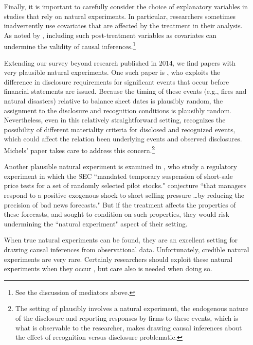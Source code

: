 \documentclass[12pt,reqno,titlepage]{amsart}
\theoremstyle{definition}
\begin{document}
\begin{doublespace}
Finally, it is important to carefully consider the choice of explanatory variables in studies that rely on natural experiments.
In particular, researchers sometimes inadvertently use covariates that are affected by the treatment in their analysis.  
As noted by \citet[p.\,116]{Imbens:2015aa}, including such post-treatment variables as covariates can undermine the validity of causal inferences.\footnote{See the discussion of mediators above.}

Extending our survey beyond research published in 2014, we find papers with very plausible natural experiments.
One such paper is \citet{Michels:2015aa}, who exploits the difference in disclosure requirements for significant events that occur before financial statements are issued. 
Because the timing of these events (e.g., fires and natural disasters) relative to balance sheet dates is plausibly random, the assignment to the disclosure and recognition conditions is plausibly random. 
Nevertheless, even in this relatively straightforward setting, \citet{Michels:2015aa} recognizes the possibility of different materiality criteria for disclosed and recognized events, which could affect the relation been underlying events and observed disclosures. Michels' paper takes care to address this concern.\footnote{The setting of \citet{Michels:2015aa} plausibly involves a natural experiment, the endogenous nature of the disclosure and reporting responses by firms to these events, which is what is observable to the researcher, makes drawing causal inferences about the effect of recognition versus disclosure problematic.}

Another plausible natural experiment is examined in \citet[p.\,80]{Li:2015he}, who study a regulatory experiment in which the SEC ``mandated temporary suspension of short-sale price tests for a set of randomly selected pilot stocks." 
\citet[p.\,79]{Li:2015he} conjecture ``that managers respond to a positive exogenous shock to short selling pressure \dots by reducing the precision of bad news forecasts." 
But if the treatment affects the properties of these forecasts, and \citet[p.\,79]{Li:2015he} sought to condition on such properties, they would risk undermining the ``natural experiment" aspect of their setting.

When true natural experiments can be found, they are an excellent setting for drawing causal inferences from observational data. 
Unfortunately, credible natural experiments are very rare.
Certainly researchers should exploit these natural experiments when they occur \citep[e.g.,][]{Michels:2015aa,Li:2015he}, but care also is needed when doing so.


\end{doublespace}
\end{document}
